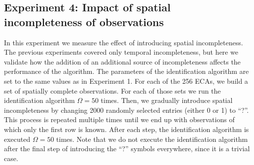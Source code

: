 \begin{table}[ht]
	\centering
	\caption{Experiment 3: The performance of the GA expressed in terms of the average of the minimum, average and maximum number of iterations per behavioral class according to Wolfram's classification scheme \protect{} and the nMLE~\protect{} in the case of constant time gaps (case~3).}\label{tab:exp3c}
	\quad
\end{table}

\subsection{Experiment 4: Impact of spatial incompleteness of observations}
In this experiment we measure the effect of introducing spatial incompleteness. The previous experiments covered only temporal incompleteness, but here we validate how the addition of an additional source of incompleteness affects the performance of the algorithm. The parameters of the identification algorithm are set to the same values as in Experiment 1. For each of the 256 ECAs, we build a set of spatially complete observations. For each of those sets we run the identification algorithm $\Omega=50$ times. Then, we gradually introduce spatial incompleteness by changing 2000 randomly selected entries  (either 0 or 1) to ``?''. This process is repeated multiple times until we end up with observations of which only the first row is known. After each step, the identification algorithm is executed $\Omega=50$ times. Note that we do not execute the identification algorithm after the final step of introducing the ``?'' symbols everywhere, since it is a trivial case.

